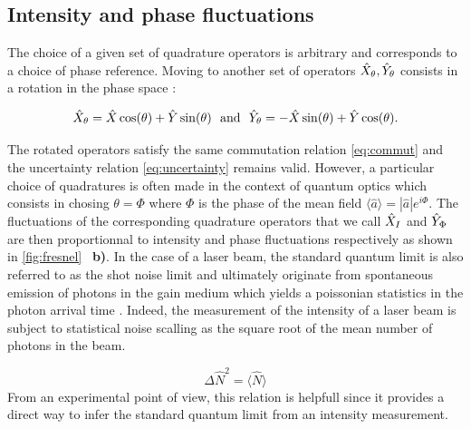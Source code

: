 \subsection{Intensity and phase fluctuations}

The choice of a given set of quadrature operators is arbitrary and corresponds to a choice of phase reference.
Moving to another set of operators $\hat{X}_{\theta},\hat{Y}_{\theta}$ consists in a rotation in the phase space :

\begin{equation}
    \hat{X}_{\theta} = \hat{X} \cos(\theta) + \hat{Y} \sin(\theta) \ \ \mathrm{and} \ \
    \hat{Y}_{\theta} = -\hat{X} \sin(\theta) + \hat{Y} \cos(\theta).
\end{equation}

The rotated operators satisfy the same commutation relation \ref{eq:commut} and the uncertainty relation \ref{eq:uncertainty} remains valid. 
However, a particular choice of quadratures is often made in the context of quantum optics \cite{grynberg_aspect_fabre} which consists in
chosing $\theta=\Phi$ where $\Phi$ is the phase of the mean field $\langle \hat{a}\rangle= |\hat{a}|e^{i\Phi}$.  The fluctuations of the corresponding quadrature
operators that we call $\hat{X}_{I}$ and $\hat{Y}_{\Phi}$ are then proportionnal to intensity and phase fluctuations respectively as shown in \autoref{fig:fresnel} ~\textbf{b)}. In the case of 
a laser beam, the standard quantum limit is also referred to as the shot noise limit and ultimately originate from spontaneous emission of photons in the gain medium which yields a poissonian statistics in the photon arrival time \cite{grynberg_aspect_fabre}.
Indeed, the measurement of the intensity of a laser beam is subject to statistical noise scalling as the square root of the mean number of photons in the beam.

\begin{equation}
    \label{eq:shotnoise}
    \Delta \hat{N}^2 = \langle \hat{N}\rangle
\end{equation}
From an experimental point of view, this relation is helpfull since it provides a direct way to infer the standard quantum limit from an intensity measurement.   


